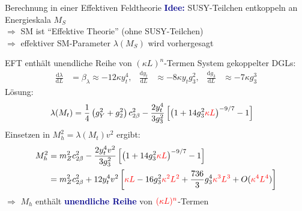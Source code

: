\documentclass[hyperref={pdfpagelabels=false},ngerman]{beamer}
\newcommand{\MS}{\ensuremath{M_S}}
\renewcommand{\emph}[1]{\textbf{\textcolor{darkblue}{#1}}}
\newcommand{\dd}{\text{d}}
\begin{document}
\begin{frame}{Berechnung in einer Effektiven Feldtheorie}
  \emph{Idee:} SUSY-Teilchen entkoppeln an Energieskala $\MS$ \\
  $\Rightarrow$ SM ist ``Effektive Theorie'' (ohne SUSY-Teilchen)\\
  $\Rightarrow$ effektiver SM-Parameter $\lambda(\MS)$ wird vorhergesagt  \\
  \begin{center}
  \end{center}
\end{frame}

\begin{frame}{EFT enthält unendliche Reihe von $(\kappa L)^n$-Termen}
  System gekoppelter DGLs:
  \begin{align*}
    \frac{\dd\lambda}{\dd L} &= \beta_\lambda \approx -12 \kappa y_t^4 , &
    \frac{\dd y_t}{\dd L} &\approx -8 \kappa y_t g_3^2 , &
    \frac{\dd g_3}{\dd L} &\approx -7 \kappa g_3^3
  \end{align*}
  Lösung:
  \begin{align*}
    \lambda(M_t) &= \frac{1}{4}\left(g_Y^{2} + g_2^2\right) c^2_{2\beta} %
                   - \frac{2 y_t^4}{3 g_3^2} \left[
                   \left( 1 + 14 g_3^2 \textcolor{red}{\kappa L} \right)^{-9/7} - 1
    \right]
  \end{align*}
  Einsetzen in $M_h^2 = \lambda(M_t) v^2$ ergibt:
  \begin{align*}
    M_h^2 &= m_Z^2 c^2_{2\beta}
            - \frac{2 y_t^4 v^2}{3 g_3^2} \left[
            \left( 1 + 14 g_3^2 \textcolor{red}{\kappa L} \right)^{-9/7} - 1
            \right]\\
          &= m_Z^2 c^2_{2\beta}
            + 12 y_t^4 v^2 \left[
            \textcolor{red}{\kappa L}
            - 16 g_3^2 \textcolor{red}{\kappa^2 L^2}
            + \frac{736}{3} g_3^4 \textcolor{red}{\kappa^3 L^3} + O(\textcolor{red}{\kappa^4L^4})
            \right]
  \end{align*}
  $\Rightarrow$ $M_h$ enthält \emph{unendliche Reihe} von $\textcolor{red}{(\kappa L)^n}$-Termen
\end{frame}
\end{document}
